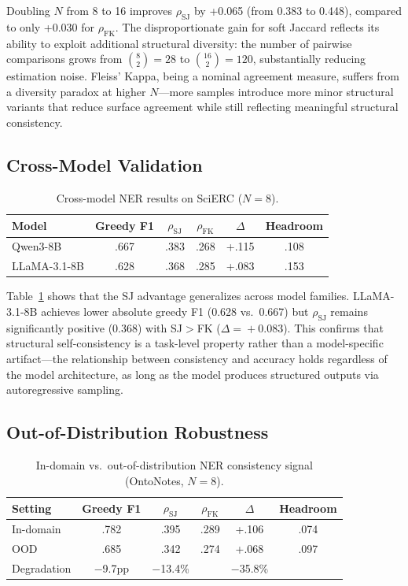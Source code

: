 \documentclass[11pt,a4paper]{article}
\newcommand{\rhosj}{\rho_{\mathrm{SJ}}}
\newcommand{\rhofk}{\rho_{\mathrm{FK}}}
\begin{document}
Doubling $N$ from 8 to 16 improves $\rhosj$ by +0.065 (from 0.383 to 0.448), compared to only +0.030 for $\rhofk$. The disproportionate gain for soft Jaccard reflects its ability to exploit additional structural diversity: the number of pairwise comparisons grows from $\binom{8}{2}\!=\!28$ to $\binom{16}{2}\!=\!120$, substantially reducing estimation noise. Fleiss' Kappa, being a nominal agreement measure, suffers from a diversity paradox at higher $N$---more samples introduce more minor structural variants that reduce surface agreement while still reflecting meaningful structural consistency.

\subsection{Cross-Model Validation}

\begin{table}[t]
\centering
\caption{Cross-model NER results on SciERC ($N\!=\!8$).}
\label{tab:cross_model}
\small
\begin{tabular}{lccccc}
\toprule
\textbf{Model} & \textbf{Greedy F1} & \textbf{$\rhosj$} & \textbf{$\rhofk$} & \textbf{$\Delta$} & \textbf{Headroom} \\
\midrule
Qwen3-8B        & .667 & .383 & .268 & +.115 & .108 \\
LLaMA-3.1-8B    & .628 & .368 & .285 & +.083 & .153 \\
\bottomrule
\end{tabular}
\end{table}

Table~\ref{tab:cross_model} shows that the SJ advantage generalizes across model families. LLaMA-3.1-8B achieves lower absolute greedy F1 (0.628 vs.\ 0.667) but $\rhosj$ remains significantly positive (0.368) with SJ$>$FK ($\Delta\!=\!+0.083$). This confirms that structural self-consistency is a task-level property rather than a model-specific artifact---the relationship between consistency and accuracy holds regardless of the model architecture, as long as the model produces structured outputs via autoregressive sampling.

\subsection{Out-of-Distribution Robustness}

\begin{table}[t]
\centering
\caption{In-domain vs.\ out-of-distribution NER consistency signal (OntoNotes, $N\!=\!8$).}
\label{tab:ood}
\small
\begin{tabular}{lccccc}
\toprule
\textbf{Setting} & \textbf{Greedy F1} & \textbf{$\rhosj$} & \textbf{$\rhofk$} & \textbf{$\Delta$} & \textbf{Headroom} \\
\midrule
In-domain  & .782 & .395 & .289 & +.106 & .074 \\
OOD        & .685 & .342 & .274 & +.068 & .097 \\
\midrule
Degradation & $-$9.7pp & $-$13.4\% & & $-$35.8\% & \\
\bottomrule
\end{tabular}
\end{table}
\end{document}
